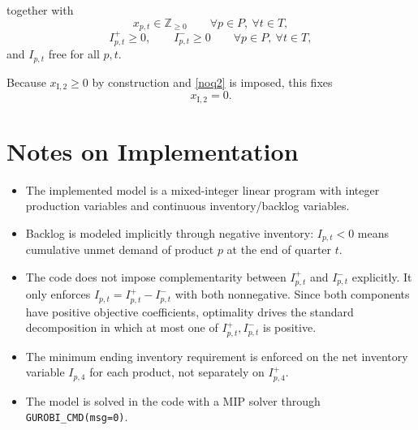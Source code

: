 together with
\[
x_{p,t} \in \mathbb{Z}_{\ge 0} \qquad \forall p \in P,\ \forall t \in T,
\]
\[
I^+_{p,t} \ge 0,\qquad I^-_{p,t} \ge 0
\qquad \forall p \in P,\ \forall t \in T,
\]
and $I_{p,t}$ free for all $p,t$.

Because $x_{\mathrm{I},2}\ge 0$ by construction and \eqref{noq2} is imposed, this fixes
\[
x_{\mathrm{I},2}=0.
\]

\section*{Notes on Implementation}

\begin{itemize}
    \item The implemented model is a mixed-integer linear program with integer production variables and continuous inventory/backlog variables.
    \item Backlog is modeled implicitly through negative inventory: $I_{p,t}<0$ means cumulative unmet demand of product $p$ at the end of quarter $t$.
    \item The code does not impose complementarity between $I^+_{p,t}$ and $I^-_{p,t}$ explicitly. It only enforces $I_{p,t}=I^+_{p,t}-I^-_{p,t}$ with both nonnegative. Since both components have positive objective coefficients, optimality drives the standard decomposition in which at most one of $I^+_{p,t}, I^-_{p,t}$ is positive.
    \item The minimum ending inventory requirement is enforced on the net inventory variable $I_{p,4}$ for each product, not separately on $I^+_{p,4}$.
    \item The model is solved in the code with a MIP solver through \texttt{GUROBI\_CMD(msg=0)}.
\end{itemize}

